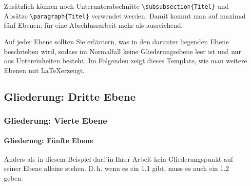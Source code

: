 Zusätzlich können noch Unterunterabschnitte \verb+\subsubsection{Titel}+ und Absätze \verb+\paragraph{Titel}+ verwendet werden. Damit kommt man auf maximal fünf Ebenen; für eine Abschlussarbeit mehr als ausreichend.

Auf jeder Ebene sollten Sie erläutern, was in den darunter liegenden Ebene beschrieben wird, sodass im Normalfall keine Gliederungsebene leer ist und nur aus Untereinheiten besteht. Im Folgenden zeigt dieses Template, wie man weitere Ebenen mit \LaTeX erzeugt.

\subsection{Gliederung: Dritte Ebene}

\label{Gliederung:EbeneDrei}


\subsubsection{Gliederung: Vierte Ebene}

\paragraph{Gliederung: Fünfte Ebene} Anders als in diesem Beispiel darf in Ihrer Arbeit kein Gliederungspunkt auf seiner Ebene alleine stehen. D.\,h. wenn es ein 1.1 gibt, muss es auch ein 1.2 geben.
